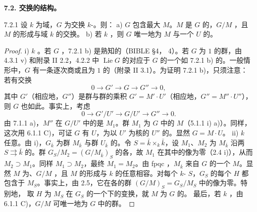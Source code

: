 \textbf{7.2. 交换的结构。}
\begin{SGAresult}{}{7.2.1}
设 $k$ 为域，$G$ 为交换 $k$-。则：
a) $G$ 包含最大 $M$。$M$ 是 $G$ 的，$G/M$ ，且 $M$ 的形成与域 $k$ 的交换。
b) 若 $k$ ，则 $G$ 唯一地为 $M$ 与一个 $U$ 的。
\end{SGAresult}
\begin{proof}
i) $k$ 。若 $G$ ，7.2.1 b) 是熟知的（BIBLE §4， 4）。若 $G$ 为 $1$ 的群，由 4.3.1 v) 和附录 II 2.2，4.2.2 中 $\operatorname{Lie}G$ 的对应于 $G$ 的一个如 7.2.1 b) 的。一般情形中，$G$ 有一条逐次商或且为 $1$ 的（附录 II 3.1）。为证明 7.2.1 b)，只须注意：若有交换
\[0\longrightarrow G'\longrightarrow G\longrightarrow G''\longrightarrow0,\]
其中 $G'$（相应地，$G''$）是群与群的乘积 $G'=M'\cdot U'$（相应地，$G''=M''\cdot U''$），则 $G$ 也如此。事实上，考虑
\[0\longrightarrow G'/U'\longrightarrow G/U'\longrightarrow G''\longrightarrow0.\]
由 7.1.1 a)，$M''$ 在 $G/U'$ 中的是 $M_1$。群 $M_1$ 为 $G$ 中的 $M$（5.1.1 i) a)）。同样，这次用 6.1.1 C)，可证 $G$ 有 $U$，为以 $U'$ 为核的 $U''$ 的。显然 $G=M\cdot U$。
ii) $k$ 任意。由 i)，$G_{\bar k}$ 为群 $M_{\bar k}$ 与群 $U_{\bar k}$ 的。令 $S=\bar k\times_k\bar k$，设 $M_1$、$M_2$ 为 $M_{\bar k}$ 沿两 $S\rightrightarrows\bar k$ 的。群 $G_S/M_2=(G/M_{\bar k})_S$ 的各，故 $M_1$ 在其中的像为零（2.4 i)），从而 $M_2\supset M_1$。同样 $M_1\supset M_2$，最终 $M_1=M_2$。由 fpqc ，$M_{\bar k}$ 来自 $G$ 的一个 $M$。显然 $M$ 为、$G/M$ ，且 $M$ 的形成与 $k$ 的任意相容。对每个 $k$- $S$，$G_S$ 的每个 $H$ 都包含于 $M_S$。事实上，由 2.5，它在各的群 $(G/M)_S=G_S/M_S$ 中的像为零。特别地，
取 $H$ 为 $M_S$ 在 $G_S$ 的一个下的变换，就 $M$ 为 $G$ 的。
最后，若 $k$ ，由 6.1.1 C)，$G/M$ 可唯一地为 $G$ 中的群。
\end{proof}
